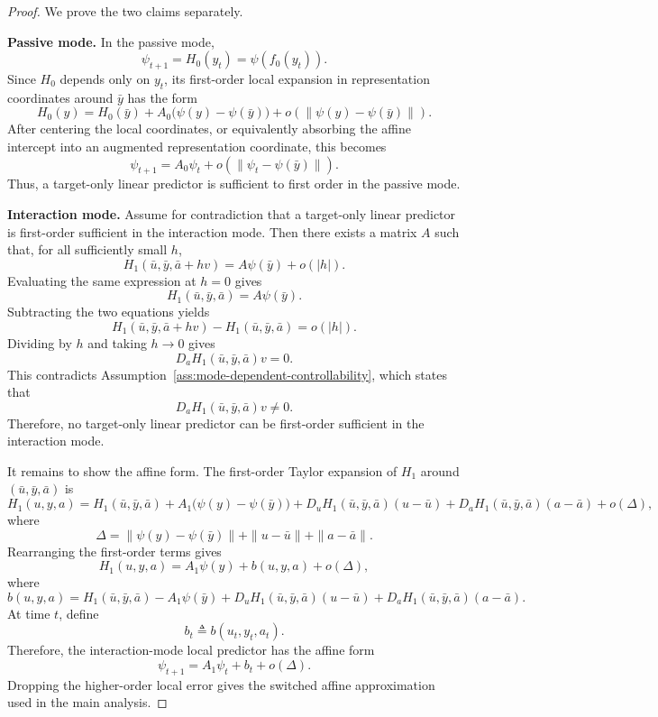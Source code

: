 \begin{proof}
We prove the two claims separately.

\textbf{Passive mode.}
In the passive mode,
\[
    \psi_{t+1}
    =
    H_0(y_t)
    =
    \psi(f_0(y_t)).
\]
Since $H_0$ depends only on $y_t$, its first-order local expansion in representation coordinates around $\bar y$ has the form
\[
    H_0(y)
    =
    H_0(\bar y)
    +
    A_0\bigl(\psi(y)-\psi(\bar y)\bigr)
    +
    o\!\left(\|\psi(y)-\psi(\bar y)\|\right).
\]
After centering the local coordinates, or equivalently absorbing the affine intercept into an augmented representation coordinate, this becomes
\[
    \psi_{t+1}
    =
    A_0\psi_t
    +
    o\!\left(\|\psi_t-\psi(\bar y)\|\right).
\]
Thus, a target-only linear predictor is sufficient to first order in the passive mode.

\textbf{Interaction mode.}
Assume for contradiction that a target-only linear predictor is first-order sufficient in the interaction mode.
Then there exists a matrix $A$ such that, for all sufficiently small $h$,
\[
    H_1(\bar u,\bar y,\bar a+hv)
    =
    A\psi(\bar y)
    +
    o(|h|).
\]
Evaluating the same expression at $h=0$ gives
\[
    H_1(\bar u,\bar y,\bar a)
    =
    A\psi(\bar y).
\]
Subtracting the two equations yields
\[
    H_1(\bar u,\bar y,\bar a+hv)
    -
    H_1(\bar u,\bar y,\bar a)
    =
    o(|h|).
\]
Dividing by $h$ and taking $h\rightarrow 0$ gives
\[
    D_aH_1(\bar u,\bar y,\bar a)v
    =
    0.
\]
This contradicts Assumption~\ref{ass:mode-dependent-controllability}, which states that
\[
    D_aH_1(\bar u,\bar y,\bar a)v \neq 0.
\]
Therefore, no target-only linear predictor can be first-order sufficient in the interaction mode.

It remains to show the affine form.
The first-order Taylor expansion of $H_1$ around $(\bar u,\bar y,\bar a)$ is
\[
    H_1(u,y,a)
    =
    H_1(\bar u,\bar y,\bar a)
    +
    A_1\bigl(\psi(y)-\psi(\bar y)\bigr)
    +
    D_uH_1(\bar u,\bar y,\bar a)(u-\bar u)
    +
    D_aH_1(\bar u,\bar y,\bar a)(a-\bar a)
    +
    o(\Delta),
\]
where
\[
    \Delta
    =
    \|\psi(y)-\psi(\bar y)\|
    +
    \|u-\bar u\|
    +
    \|a-\bar a\|.
\]
Rearranging the first-order terms gives
\[
    H_1(u,y,a)
    =
    A_1\psi(y)
    +
    b(u,y,a)
    +
    o(\Delta),
\]
where
\[
    b(u,y,a)
    =
    H_1(\bar u,\bar y,\bar a)
    -
    A_1\psi(\bar y)
    +
    D_uH_1(\bar u,\bar y,\bar a)(u-\bar u)
    +
    D_aH_1(\bar u,\bar y,\bar a)(a-\bar a).
\]
At time $t$, define
\[
    b_t \triangleq b(u_t,y_t,a_t).
\]
Therefore, the interaction-mode local predictor has the affine form
\[
    \psi_{t+1}
    =
    A_1\psi_t+b_t
    +
    o(\Delta).
\]
Dropping the higher-order local error gives the switched affine approximation used in the main analysis.
\end{proof}

